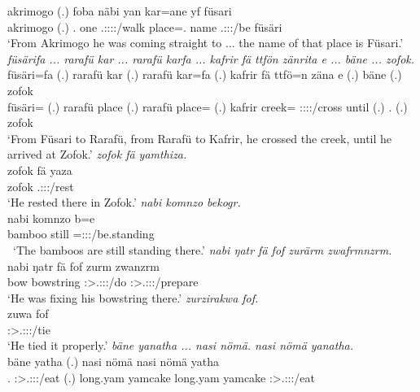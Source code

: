 \begin{exe}
	\gll akrimogo (.) foba näbi yan kar=ane yf  füsari\\ 
	akrimogo (.) \Dist.{\Abl} one \Tsg.\Masc:\Sbj:\Pst:\Ipfv:\Venit/walk place=\Poss.{\Sg} name \Tsg.\F:\Sbj:\Nonpast:\Ipfv/be füsäri\\
	\trans `From Akrimogo he was coming straight to ... the name of that place is Füsari.'
	\emph{füsärifa ... rarafü kar ... rarafü karfa ... kafrir fä ttfön zänrita e ... bäne ... zofok.}\\
	\gll füsäri=fa (.) rarafü kar (.) rarafü kar=fa (.) kafrir fä ttfö=n zäna e (.) bäne (.) zofok\\ 
	füsäri={\Abl} (.) rarafü place (.) rarafü place={\Abl} (.) kafrir {\Dist} creek={\Loc} \Sg:\Sbj:\Pst:\Pfv:\Venit/cross until (.) \Recog.{\Abs} (.) zofok\\
	\trans `From Füsari to Rarafü, from Rarafü to Kafrir, he crossed the creek, until he arrived at Zofok.'
	\emph{zofok fä yamthiza.}\\
	\gll zofok fä yaza\\ 
	zofok {\Dist} \Tsg.\Masc:\Sbj:\Pst:\Ipfv/rest\\
	\trans `He rested there in Zofok.'
	\emph{nabi komnzo bekogr.}\\
	\gll nabi komnzo b=e\\ 
	bamboo still \Med=\Stpl:\Sbj:\Nonpast:\Stat/be.standing \\\
	\trans `The bamboos are still standing there.'
	\emph{nabi ŋatr fä fof zurärm zwafrmnzrm.}\\
	\gll nabi ŋatr fä fof zurm zwanzrm\\ 
	bow bowstring {\Dist} {\Emph} \Sg:\Sbj>\Tsg.\F:\Obj:\Pst:\Dur/do \Sg:\Sbj>\Tsg.\F:\Obj:\Pst:\Dur/prepare\\
	\trans `He was fixing his bowstring there.'
	\emph{zurzirakwa fof.}\\
	\gll zuwa fof\\ 
	\Sg:\Sbj>\Tsg.\F:\Obj:\Pst:\Ipfv/tie \Emph\\
	\trans `He tied it properly.'
	\emph{bäne yanatha ... nasi nömä. nasi nömä yanatha.}\\
	\gll bäne yatha (.) nasi nömä nasi nömä yatha\\ 
	\Recog.{\Abs} \Sg:\Sbj>\Tsg.\Masc:\Obj:\Pst:\Ipfv/eat (.) long.yam yamcake long.yam yamcake \Sg:\Sbj>\Tsg.\Masc:\Obj:\Pst:\Ipfv/eat\\

\end{exe}
